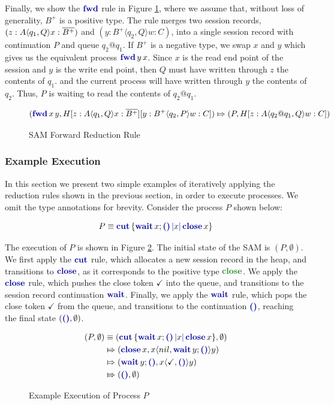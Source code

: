 Finally, we show the $\fwdp$ rule in Figure \ref{fig:SAMForwardRule}, where we assume that, without loss of generality, $B^+$ is a positive type. The rule merges two session records, $(z:A\langle q_1, Q\rangle x:\overline{B^+})$ and $(y:B^+\langle q_2, Q\rangle w:C)$, into a single session record with continuation $P$ and queue $q_2@q_1$. If $B^+$ is a negative type, we swap $x$ and $y$ which gives us the equivalent process $\fwdc{y}{x}$.  Since $x$ is the read end point of the session and $y$ is the write end point, then $Q$ must have written through $z$ the contents of $q_1$. and the current process will have written through $y$ the contents of $q_2$. Thus, $P$ is waiting to read the contents of $q_2@q_1$.

\begin{figure}[H]
    \centering
    $$
        (\fwdc{x}{y}, H[z:A\langle q_1, Q\rangle x:\dual{B^+}][y:B^+\langle q_2, P\rangle w:C])
        \Mapsto
        (P,H[z:A\langle q_2@q_1, Q\rangle w:C])
    $$
    \caption{SAM Forward Reduction Rule}
    \label{fig:SAMForwardRule}
\end{figure}

\subsubsection{Example Execution}

In this section we present two simple examples of iteratively applying the reduction rules shown in the previous section, in order to execute processes. We omit the type annotations for brevity. Consider the process $P$ shown below:

$$
    P \equiv \cutc{\waitc{x}{\emptyc}}{x}{\closec{x}}
$$

The execution of $P$ is shown in Figure \ref{fig:SAMExampleExecutionP}. The initial state of the SAM is $(P, \emptyset)$. We first apply the $\cutp$ rule, which allocates a new session record in the heap, and transitions to $\closep$, as it corresponds to the positive type $\closet$. We apply the $\closep$ rule, which pushes the close token $\checkmark$ into the queue, and transitions to the session record continuation $\waitp$. Finally, we apply the $\waitp$ rule, which pops the close token $\checkmark$ from the queue, and transitions to the continuation $\emptyc$, reaching the final state $(\emptyc, \emptyset)$.

\begin{figure}[H]
    \begin{align*}
        (P, \emptyset)
         & \equiv
        (\cutc{\waitc{x}{\emptyc}}{x}{\closec{x}}, \emptyset)                \\
         & \Mapsto
        (\closec{x}, x\langle nil, \waitc{y}\emptyc\rangle y)                \\
         & \Mapsto (\waitc{y}\emptyc, x\langle \checkmark, \emptyp\rangle y) \\
         & \Mapsto
        (\emptyc, \emptyset)
    \end{align*}
    \caption{Example Execution of Process $P$}
    \label{fig:SAMExampleExecutionP}
\end{figure}

